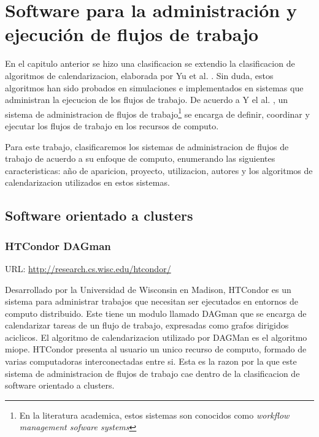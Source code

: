 \chapter{Software para la administración y ejecución de flujos de trabajo}

En el capitulo anterior se hizo una clasificacion se extendio la clasificacion de algoritmos de calendarizacion, elaborada por Yu et al. \cite{yu2008workflow}. Sin duda, estos algoritmos han sido probados en simulaciones e implementados en sistemas que administran la  ejecucion de los flujos de trabajo. De acuerdo a Y el al. \cite{yu2008workflow}, un sistema de administracion de flujos de trabajo\footnote{En la literatura academica, estos sistemas son conocidos como \emph{workflow management sofware systems}} se encarga de definir, coordinar y ejecutar los flujos de trabajo en los recursos de computo.

Para este trabajo, clasificaremos los sistemas de administracion de flujos de trabajo de acuerdo a su enfoque de computo, enumerando las siguientes caracteristicas: año de aparicion, proyecto, utilizacion, autores y los algoritmos de calendarizacion utilizados en estos sistemas.

\section{Software orientado a clusters}


\subsection{HTCondor DAGman}
URL: \url{http://research.cs.wisc.edu/htcondor/}

Desarrollado por la Universidad de Wisconsin en Madison, HTCondor es un sistema para administrar trabajos que necesitan ser ejecutados en entornos de computo distribuido. Este tiene un modulo llamado DAGman que se encarga de calendarizar tareas de un flujo de trabajo, expresadas como grafos dirigidos aciclicos. El algoritmo de calendarizacion utilizado por DAGMan es el algoritmo miope. 
HTCondor presenta al usuario un unico recurso de computo, formado de varias computadoras interconectadas entre si. Esta es la razon por la que este sistema de administracion de flujos de trabajo cae dentro de la clasificacion de software orientado a clusters.

